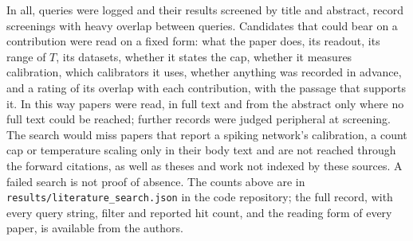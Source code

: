 \documentclass[10pt]{article}
\begin{document}
\enlargethispage{2\baselineskip}In all, \lsQueryRows{} queries were logged and their results screened by title and abstract, %
\lsScreenings{} record screenings with heavy overlap between queries. Candidates that could bear on %
a contribution were read on a fixed form: what the paper does, its readout, its range of $T$, its
datasets, whether it states the cap, whether it measures calibration, which calibrators it uses,
whether anything was recorded in advance, and a rating of its overlap with each contribution, with
the passage that supports it. In this way \lsRead{} papers were read, \lsReadFull{} in full text %
and \lsReadAbstract{} from the abstract only where no full text could be reached; \lsLow{} further %
records were judged peripheral at screening. The search would miss papers that report a
spiking network's calibration, a count cap or temperature scaling only in their body text and
are not reached through the forward citations, as well as theses and work not indexed by these
sources. A failed search is not proof of absence. The counts above are in
\texttt{results/literature\_search.json} in the code repository; the full record, with every
query string, filter and reported hit count, and the reading form of every paper, is available
from the authors.
\end{document}
